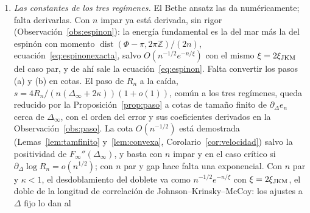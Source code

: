 \documentclass[11pt,a4paper]{article}
\theoremstyle{remark}
\begin{document}
\begin{enumerate}
  \emph{Una vía rigurosa con $\kappa$ pequeño.} Para el Teorema~\ref{teo:puente} basta cualquier
  $\xi<\infty$, y por la Proposición~\ref{prop:limite}(vi), con $\kappa$ pequeño el testigo límite
  tiene $\Delta_\infty\approx1/\kappa$ grande. Tras el giro de Marshall, el XXZ es entonces el
  antiferromagneto de Ising, con dos fundamentales de Néel con $n$ par, más un salto de tamaño relativo
  $1/\Delta$. Para esas perturbaciones cuánticas de modelos clásicos hay desarrollos en clústeres
  convergentes (Pirogov--Sinai cuántico y las transformaciones unitarias cuasi-locales de
  Kennedy--Tasaki y de Yarotsky), y el flujo, que es un gauge salvo en un enlace, solo lo ven los
  clústeres que dan la vuelta al anillo, de tamaño $\ge n/2$. Eso debería dar (E) en forma bilateral
  y (M) con $\xi_0\sim2/\log(c\,\Delta_\infty)$, y con ellos un teorema: existe $\kappa_0>0$ tal que,
  para $0<\kappa<\kappa_0$ y $n$ par, la sensibilidad es $O(e^{-n/\xi_0})$. No se ha hecho aquí, y
  falta comprobar que esos resultados cubren el anillo retorcido con fundamental casi degenerado. En
  el sector de una pared de dominio ($n$ impar), el mismo desarrollo daría un hamiltoniano efectivo de
  una partícula con flujo $\Phi/2$, y con él la ley $1/n^3$.
\item\label{prob:constantes} \emph{Las constantes de los tres regímenes.} El Bethe ansatz las da numéricamente; falta
  derivarlas. Con $n$ impar ya está derivada, sin rigor (Observación~\ref{obs:espinon}): la
  energía fundamental es la del mar más la del espinón con momento
  $\operatorname{dist}(\Phi-\pi,2\pi\mathbb Z)/(2n)$, ecuación~\eqref{eq:espinonexacta}, salvo
  $O(n^{-1/2}e^{-n/\xi})$ con el mismo $\xi=2\xi_{\rm JKM}$ del caso par, y de ahí sale
  la ecuación~\eqref{eq:espinon}. Falta convertir los pasos (a) y (b) en cotas. El paso de $R_n$
  a la caída, $s=4R_n/(n(\Delta_\infty+2\kappa))(1+o(1))$, común a los tres regímenes, queda
  reducido por la Proposición~\ref{prop:paso} a cotas de tamaño finito de $\partial_\Delta e_n$ cerca
  de $\Delta_\infty$, con el orden del error y sus coeficientes derivados en la
  Observación~\ref{obs:paso}. La cota $O(n^{-1/2})$ está demostrada (Lemas~\ref{lem:tamfinito}
  y~\ref{lem:convexa}, Corolario~\ref{cor:velocidad}) salvo la positividad de $F_\infty''(\Delta_\infty)$,
  y basta con $n$ impar y en el caso crítico si $\partial_\Delta\log R_n=o(n^{1/2})$; con $n$ par y
  gap hace falta una exponencial. Con $n$ par y $\kappa<1$, el
  desdoblamiento del doblete va como $n^{-1/2}e^{-n/\xi}$ con $\xi=2\xi_{\rm JKM}$, el doble de la
  longitud de correlación de Johnson--Krinsky--McCoy: los ajustes a $\Delta$ fijo lo dan al

\end{enumerate}
\end{document}
